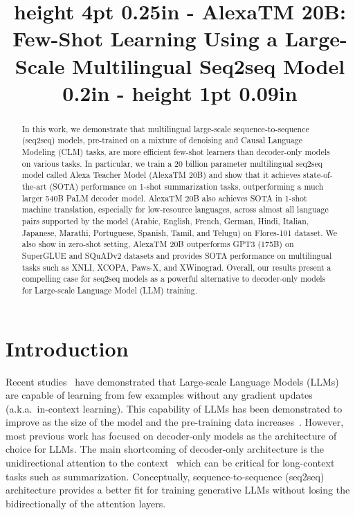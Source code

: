 \title{height 4pt 0.25in - AlexaTM 20B: Few-Shot Learning Using a Large-Scale Multilingual Seq2seq Model 0.2in - height 1pt 0.09in}

\begin{abstract}
In this work, we demonstrate that multilingual large-scale sequence-to-sequence (seq2seq) models, pre-trained on a mixture of denoising and Causal Language Modeling (CLM) tasks, are more efficient few-shot learners than decoder-only models on various tasks. In particular, we train a 20 billion parameter multilingual seq2seq model called Alexa Teacher Model ({AlexaTM 20B}) and show that it achieves state-of-the-art (SOTA) performance on 1-shot summarization tasks, outperforming a much larger 540B PaLM decoder model. {AlexaTM 20B} also achieves SOTA in 1-shot machine translation, especially for low-resource languages, across almost all language pairs supported by the model (Arabic, English, French, German, Hindi, Italian, Japanese, Marathi, Portuguese, Spanish, Tamil, and Telugu) on Flores-101 dataset. We also show in zero-shot setting, {AlexaTM 20B} outperforms GPT3 (175B) on SuperGLUE and SQuADv2 datasets and provides SOTA performance  on multilingual tasks such as XNLI, XCOPA, Paws-X, and XWinograd. Overall, our results present a compelling case for seq2seq models as a powerful alternative to decoder-only models for Large-scale Language Model (LLM) training.
\end{abstract}

\section{Introduction}
\label{sec:introduction}

Recent studies~\citep{Brown2020LanguageMA,Chowdhery2022PaLMSL} have demonstrated that Large-scale Language Models (LLMs) are capable of learning from few examples without any gradient updates (a.k.a.\ in-context learning). This capability of LLMs has been demonstrated to improve as the size of the model and the pre-training data increases~\citep{rae2021scaling,Hoffmann2022TrainingCL}. However, most  previous work has focused on decoder-only models as the architecture of choice for LLMs. The main shortcoming of decoder-only architecture is the unidirectional attention to the context~\citep{Radford2018ImprovingLU} which can be critical for long-context tasks such as summarization. Conceptually, sequence-to-sequence (seq2seq) architecture provides a better fit for training generative LLMs without losing the bidirectionally of the attention layers.  

